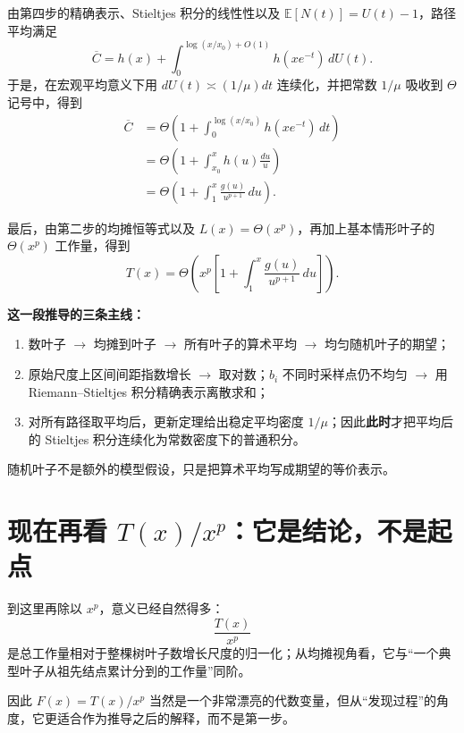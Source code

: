 \documentclass[11pt,a4paper]{article}
\begin{document}
由第四步的精确表示、Stieltjes 积分的线性性以及 $\mathbb E[N(t)]=U(t)-1$，路径平均满足
\begin{equation}
\overline C
=h(x)+\int_{0}^{\log(x/x_0)+O(1)} h(xe^{-t})\,dU(t).
\label{eq:expected-stieltjes-v47}
\end{equation}
于是，在宏观平均意义下用 $dU(t)\asymp (1/\mu)dt$ 连续化，并把常数 $1/\mu$ 吸收到 $\Theta$ 记号中，得到
\begin{align}
\overline C
&=\Theta\!\left(1+\int_{0}^{\log(x/x_0)} h(xe^{-t})\,dt\right)\\
&=\Theta\!\left(1+\int_{x_0}^{x} h(u)\frac{du}{u}\right)\\
&=\Theta\!\left(1+\int_{1}^{x}\frac{g(u)}{u^{p+1}}\,du\right).
\label{eq:average-to-integral-v47}
\end{align}

最后，由第二步的均摊恒等式以及 $L(x)=\Theta(x^p)$，再加上基本情形叶子的 $\Theta(x^p)$ 工作量，得到
\begin{equation}
T(x)=\Theta\!\left(
 x^p\left[1+\int_{1}^{x}\frac{g(u)}{u^{p+1}}\,du\right]
\right).
\end{equation}

\begin{tcolorbox}
\textbf{这一段推导的三条主线：}
\begin{enumerate}[label=(\arabic*),leftmargin=2.2em,itemsep=0.28em,topsep=0.28em]
\item 数叶子 $\to$ 均摊到叶子 $\to$ 所有叶子的算术平均 $\to$ 均匀随机叶子的期望；
\item 原始尺度上区间间距指数增长 $\to$ 取对数；$b_i$ 不同时采样点仍不均匀 $\to$ 用 Riemann--Stieltjes 积分精确表示离散求和；
\item 对所有路径取平均后，更新定理给出稳定平均密度 $1/\mu$；因此\textbf{此时}才把平均后的 Stieltjes 积分连续化为常数密度下的普通积分。
\end{enumerate}
随机叶子不是额外的模型假设，只是把算术平均写成期望的等价表示。
\end{tcolorbox}

\section{现在再看 $T(x)/x^p$：它是结论，不是起点}
到这里再除以 $x^p$，意义已经自然得多：
\[
\frac{T(x)}{x^p}
\]
是总工作量相对于整棵树叶子数增长尺度的归一化；从均摊视角看，它与“一个典型叶子从祖先结点累计分到的工作量”同阶。

因此 $F(x)=T(x)/x^p$ 当然是一个非常漂亮的代数变量，但从“发现过程”的角度，它更适合作为推导之后的解释，而不是第一步。
\end{document}
